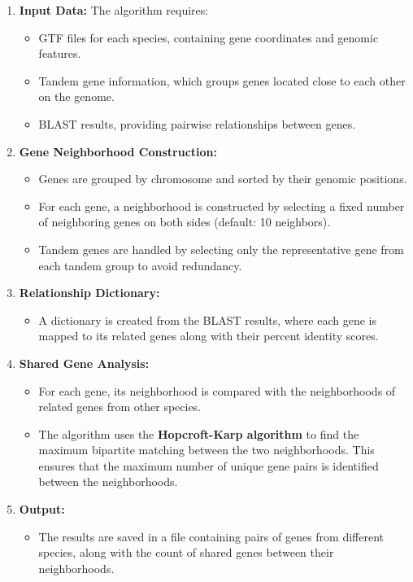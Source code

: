 \documentclass{article}
\begin{document}
\begin{enumerate}
    \item \textbf{Input Data:} The algorithm requires:
    \begin{itemize}
        \item GTF files for each species, containing gene coordinates and genomic features.
        \item Tandem gene information, which groups genes located close to each other on the genome.
        \item BLAST results, providing pairwise relationships between genes.
    \end{itemize}

    \item \textbf{Gene Neighborhood Construction:}
    \begin{itemize}
        \item Genes are grouped by chromosome and sorted by their genomic positions.
        \item For each gene, a neighborhood is constructed by selecting a fixed number of neighboring genes on both sides (default: 10 neighbors).
        \item Tandem genes are handled by selecting only the representative gene from each tandem group to avoid redundancy.
    \end{itemize}

    \item \textbf{Relationship Dictionary:}
    \begin{itemize}
        \item A dictionary is created from the BLAST results, where each gene is mapped to its related genes along with their percent identity scores.
    \end{itemize}

    \item \textbf{Shared Gene Analysis:}
    \begin{itemize}
        \item For each gene, its neighborhood is compared with the neighborhoods of related genes from other species.
        \item The algorithm uses the \textbf{Hopcroft-Karp algorithm} to find the maximum bipartite matching between the two neighborhoods. This ensures that the maximum number of unique gene pairs is identified between the neighborhoods.
    \end{itemize}

    \item \textbf{Output:}
    \begin{itemize}
        \item The results are saved in a file containing pairs of genes from different species, along with the count of shared genes between their neighborhoods.
    \end{itemize}
\end{enumerate}
\end{document}
